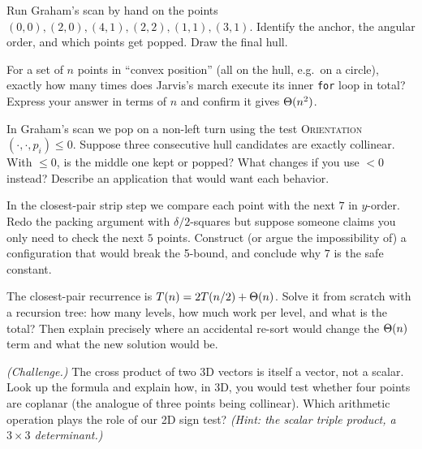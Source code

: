 \begin{exercise}\label{ch32:ex-graham}
Run Graham's scan by hand on the points
$(0,0),(2,0),(4,1),(2,2),(1,1),(3,1)$. Identify the anchor, the angular order, and
which points get popped. Draw the final hull.
\end{exercise}

\begin{exercise}\label{ch32:ex-jarvis-count}
For a set of $n$ points in ``convex position'' (all on the hull, e.g.\ on a
circle), exactly how many times does Jarvis's march execute its inner \texttt{for}
loop in total? Express your answer in terms of $n$ and confirm it gives
$\Theta(n^2)$.
\end{exercise}

\begin{exercise}\label{ch32:ex-collinear}
In Graham's scan we pop on a non-left turn using the test
\textsc{Orientation}$(\cdot,\cdot,p_i) \le 0$. Suppose three consecutive hull
candidates are exactly collinear. With $\le 0$, is the middle one kept or popped?
What changes if you use $< 0$ instead? Describe an application that would want each
behavior.
\end{exercise}

\begin{exercise}\label{ch32:ex-strip}
In the closest-pair strip step we compare each point with the next $7$ in
$y$-order. Redo the packing argument with $\delta/2$-squares but suppose someone
claims you only need to check the next $5$ points. Construct (or argue the
impossibility of) a configuration that would break the 5-bound, and conclude why
$7$ is the safe constant.
\end{exercise}

\begin{exercise}\label{ch32:ex-recurrence}
The closest-pair recurrence is $T(n) = 2T(n/2) + \Theta(n)$. Solve it from scratch
with a recursion tree: how many levels, how much work per level, and what is the
total? Then explain precisely where an accidental re-sort would change the
$\Theta(n)$ term and what the new solution would be.
\end{exercise}

\begin{exercise}\label{ch32:ex-3d-challenge}
\emph{(Challenge.)} The cross product of two 3D vectors is itself a vector, not a
scalar. Look up the formula and explain how, in 3D, you would test whether four
points are coplanar (the analogue of three points being collinear). Which
arithmetic operation plays the role of our 2D sign test? \emph{(Hint: the scalar
triple product, a $3\times3$ determinant.)}
\end{exercise}
